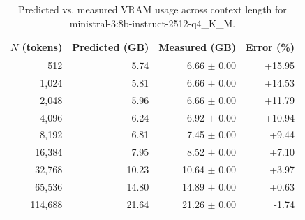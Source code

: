 \begin{table}[htbp]
\centering
\begin{tabular}{rrrr}
\toprule
$N$ (tokens) & Predicted (GB) & Measured (GB) & Error (\%) \\
\midrule
512 & 5.74 & 6.66 $\pm$ 0.00 & +15.95 \\
1,024 & 5.81 & 6.66 $\pm$ 0.00 & +14.53 \\
2,048 & 5.96 & 6.66 $\pm$ 0.00 & +11.79 \\
4,096 & 6.24 & 6.92 $\pm$ 0.00 & +10.94 \\
8,192 & 6.81 & 7.45 $\pm$ 0.00 & +9.44 \\
16,384 & 7.95 & 8.52 $\pm$ 0.00 & +7.10 \\
32,768 & 10.23 & 10.64 $\pm$ 0.00 & +3.97 \\
65,536 & 14.80 & 14.89 $\pm$ 0.00 & +0.63 \\
114,688 & 21.64 & 21.26 $\pm$ 0.00 & -1.74 \\
\bottomrule
\end{tabular}
\caption{Predicted vs. measured VRAM usage across context length for ministral-3:8b-instruct-2512-q4\_K\_M.}
\label{tab:rq4-vram-summary}
\end{table}

